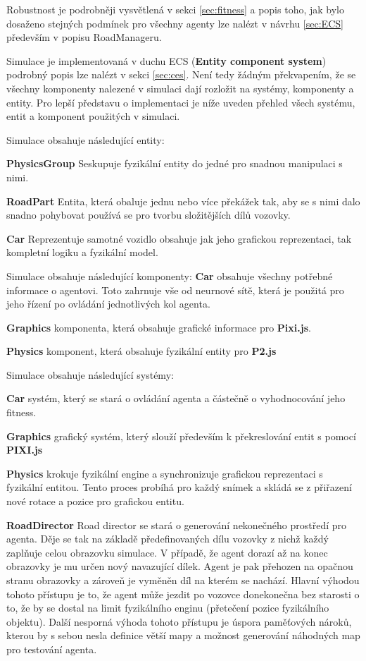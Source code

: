 Robustnost je podrobněji vysvětlená v sekci \ref{sec:fitness} a popis toho, jak bylo dosaženo stejných podmínek pro všechny agenty lze nalézt v návrhu \ref{sec:ECS} především v popisu RoadManageru.

\label{sec:ECS}
Simulace je implementovaná v duchu ECS (\textbf{Entity component system}) podrobný popis lze nalézt v sekci \ref{sec:ces}. Není tedy žádným překvapením, že se všechny komponenty nalezené v simulaci dají rozložit na systémy, komponenty a entity. Pro lepší představu o implementaci je níže uveden přehled všech systému, entit a komponent použitých v simulaci.

Simulace obsahuje následující entity:

\textbf{PhysicsGroup} Seskupuje fyzikální entity do jedné pro snadnou manipulaci s nimi.

\textbf{RoadPart} Entita, která obaluje jednu nebo více překážek tak, aby se s nimi dalo snadno pohybovat používá se pro tvorbu složitějších dílů vozovky.

\textbf{Car} Reprezentuje samotné vozidlo obsahuje jak jeho grafickou reprezentaci, tak kompletní logiku a fyzikální model.
 
Simulace obsahuje následující komponenty:
\textbf{Car} obsahuje všechny potřebné informace o agentovi. Toto zahrnuje vše od neurnové sítě, která je použitá pro jeho řízení po ovládání jednotlivých kol agenta.

\textbf{Graphics} komponenta, která obsahuje grafické informace pro \textbf{Pixi.js}.

\textbf{Physics} komponent, která obsahuje fyzikální entity pro \textbf{P2.js}

Simulace obsahuje následující systémy:

\textbf{Car} systém, který se stará o ovládání agenta a částečně o vyhodnocování jeho fitness.

\textbf{Graphics} grafický systém, který slouží především k překreslování entit s pomocí \textbf{PIXI.js}

\textbf{Physics} krokuje fyzikální engine a synchronizuje grafickou reprezentaci s fyzikální entitou. Tento proces probíhá pro každý snímek a skládá se z přiřazení nové rotace a pozice pro grafickou entitu.

\textbf{RoadDirector} Road director se stará o generování nekonečného prostředí pro agenta. Děje se tak na základě předefinovaných dílu vozovky z nichž každý zaplňuje celou obrazovku simulace. V případě, že agent dorazí až na konec obrazovky je mu určen nový navazující dílek. Agent je pak přehozen na opačnou stranu obrazovky a zároveň je vyměněn díl na kterém se nachází.
Hlavní výhodou tohoto přístupu je to, že agent může jezdit po vozovce donekonečna bez starosti o to, že by se dostal na limit fyzikálního enginu (přetečení pozice fyzikálního objektu). Další nesporná výhoda tohoto přístupu je úspora paměťových nároků, kterou by s sebou nesla definice větší mapy a možnost generování náhodných map pro testování agenta.

